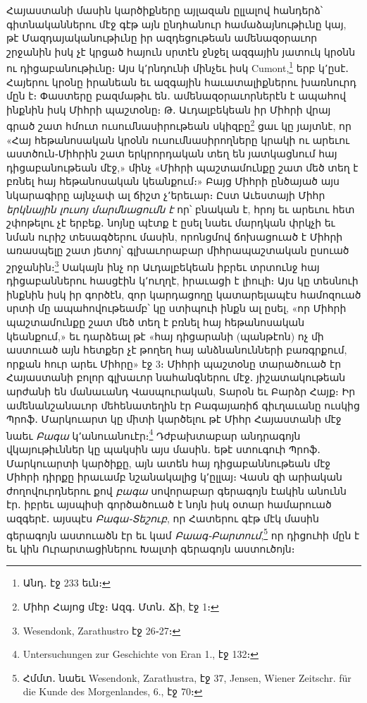 \documentclass{article}
\begin{document}
{Հայաստանի մասին կարծիքները այլազան ըլլալով հանդերձ՝ գիտնականներու մէջ գէթ այն ընդհանուր համաձայնութիւնը կայ, թէ Մազդայականութիւնը իր ազդեցութեան ամենազօրաւոր շրջանին իսկ չէ կրցած հայուն սրտէն ջնջել ազգային յատուկ կրօնն ու դիցաբանութիւնը։ Այս կ՚րնդունի մինչեւ իսկ Cumont,\footnote{Անդ․ էջ 233 եւն։} երբ կ՚ըսէ․ Հայերու կրօնը իրանեան եւ ազգային հաւատալիքներու խառնուրդ մըն է։ Փաստերը բազմաթիւ են․ ամենազօրաւորներէն է ապահով ինքնին իսկ Միհրի պաշտօնը։ Թ․ Աւդալբեկեան իր Միհրի վրայ գրած շատ հմուտ ուսումնասիրութեան սկիզբը\footnote{Միհր Հայոց մէջ։ Ազգ․ Մտն․ Ճի, էջ 1։} ցաւ կը յայտնէ, որ «Հայ հեթանոսական կրօնն ուսումնասիրողները կրակի ու արեւու աստծուն֊Միհրին շատ երկրորդական տեղ են յատկացնում հայ դիցաբանութեան մէջ,» մինչ «Միհրի պաշտամունքը շատ մեծ տեղ է բռնել հայ հեթանոսական կեանքում։» Բայց Միհրի ընծայած այս նկարագիրը այնչափ ալ ճիշտ չ՚երեւար։ Ըստ Աւեստայի Միհր \emph{երկնային լուսոյ մարմնացումն է} որ՝ բնական է, հրոյ եւ արեւու հետ շփոթելու չէ երբեք․ նոյնը պէտք է ըսել նաեւ մարդկան փրկչի եւ նման ուրիշ տեսագծերու մասին, որոնցմով ճոխացուած է Միհրի առասպելը շատ յետոյ՝ գլխաւորաբար միհրապաշտական ըսուած շրջանին։\footnote{Wesendonk, Zarathustro էջ 26֊27։} Սակայն ինչ որ Աւդալբեկեան իբրեւ տրտունջ հայ դիցաբաններու հասցէին կ՚ուղղէ, իրաւացի է լիուլի։ Այս կը տեսնուի ինքնին իսկ իր գործէն, զոր կարդացողը կատարելապէս համոզուած սրտի մը ապահովութեամբ՝ կը ստիպուի ինքն ալ ըսել, «որ Միհրի պաշտամունքը շատ մեծ տեղ է բռնել հայ հեթանոսական կեանքում,» եւ դարձեալ թէ «հայ դիցարանի (պանթէոն) ոչ մի աստուած այն հետքեր չէ թողեղ հայ անձնանունների բառգրքում, որքան հուր արեւ Միհրը» էջ 3։ Միհրի պաշտօնը տարածուած էր Հայաստանի բոլոր գլխաւոր նահանգներու մէջ․ յիշատակութեան արժանի են մանաւանդ Վասպուրական, Տարօն եւ Բարձր Հայք։ Իր ամենանշանաւոր մեհենատեղին էր Բագայառիճ գիւղաւանը ուսկից Պրոֆ․ Մարկուարտ կը միտի կարծելու թէ Միհր Հայաստանի մէջ նաեւ \emph{Բագա} կ՚անուանուէր։\footnote{Untersuchungen zur Geschichte von Eran 1., էջ 132։} Դժբախտաբար անդրագոյն վկայութիւններ կը պակսին այս մասին․ եթէ ստուգուի Պրոֆ․ Մարկուարտի կարծիքը, այն ատեն հայ դիցաբաննութեան մէջ Միհրի դիրքը իրաւամբ նշանակալից կ՚ըլլայ։ Վասն զի արիական ժողովուրդներու քով \emph{բագա} սովորաբար գերագոյն էակին անունն էր․ իբրեւ այսպիսի գործածուած է նոյն իսկ օտար համարուած ազգերէ․ այսպէս \emph{Բագա֊Տեշուբ}, որ Հատերու գէթ մէկ մասին գերագոյն աստուածն էր եւ կամ \emph{Բաագ֊Բարտում},\footnote{Հմմտ․ նաեւ Wesendonk, Zarathustra, էջ 37, Jensen, Wiener Zeitschr. für die Kunde des Morgenlandes, 6., էջ 70։} որ դիցուհի մըն է եւ կին Ուրարտացիներու Խալտի գերագոյն աստուծոյն։

}
\end{document}

